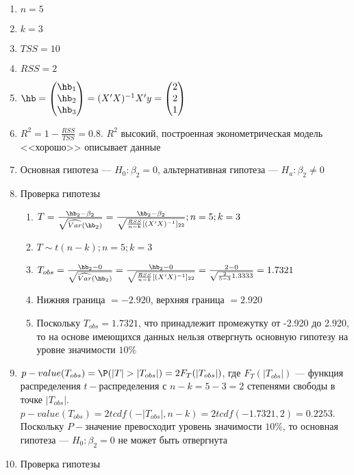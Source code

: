 \documentclass[pdftex,11pt,openany]{book}\usepackage[]{graphicx}\usepackage[]{color}
\begin{document}
\begin{solution}
\begin{enumerate}
\item $n = 5$
\item $k = 3$
\item $TSS = 10$
\item $RSS = 2$
\item $\hb = \begin{pmatrix} \hb_1 \\ \hb_2 \\ \hb_3 \end{pmatrix} = (X'X)^{-1}X'y = \begin{pmatrix} 2 \\ 2 \\ 1 \end{pmatrix}$
\item $R^2 = 1 - \frac {RSS}{TSS} = 0.8.$ $R^2$ высокий, построенная эконометрическая модель <<хорошо>> описывает данные
\item Основная гипотеза --- $H_0: \beta_2 = 0$, альтернативная гипотеза --- $H_a: \beta_2 \not= 0$
\item Проверка гипотезы
\begin{enumerate}
\item $T = \frac{\hb_2 - \beta_2}{\sqrt{\widehat{Var}(\hb_2)}} = \frac {\hb_2 - \beta_2}{\sqrt{{\frac{RSS}{n-k}}[(X'X)^{-1}]_{22}}}; n = 5; k = 3$
\item $T \sim t(n-k); n = 5; k = 3$
\item $T_{obs} = \frac{\hb_2 - 0}{\sqrt{\widehat{Var}(\hb_2)}} = \frac {\hb_2 - 0}{\sqrt{{\frac{RSS}{n-k}}[(X'X)^{-1}]_{22}}} = \frac{2-0}{\sqrt{{\frac{2}{5-3}}1.3333}} = 1.7321$
\item Нижняя граница $= -2.920$, верхняя граница $= 2.920$
\item Поскольку $T_{obs} = 1.7321$, что принадлежит промежутку от -2.920 до 2.920, то на основе имеющихся данных нельзя отвергнуть основную гипотезу на уровне значимости $10\%$
\end{enumerate}
\item $p-value(T_{obs}) = \P (|T|>|T_{obs}|) = 2F_{T}(|T_{obs}|)$, где $F_{T}(|T_{obs}|)$ --- функция распределения $t-$распределения с $n - k = 5 - 3 = 2$ степенями свободы в точке $|T_{obs}|$. $p-value(T_{obs}) = 2tcdf(-|T_{obs}|, n - k) = 2tcdf(-1.7321,2) = 0.2253$. Поскольку $P-$значение превосходит уровень значимости $10\%$, то основная гипотеза --- $H_0: \beta_2 = 0$ не может быть отвергнута
\item Проверка гипотезы

\end{enumerate}
\end{solution}
\end{document}
